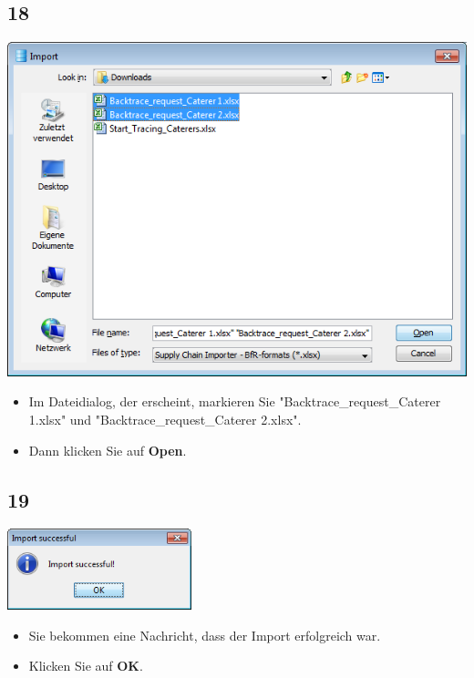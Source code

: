 \documentclass{beamer}
\begin{document}
\subsection{18}
\begin{frame}
	\begin{center}
  		\includegraphics[height=0.5\textheight]{18.png}
	\end{center}
	\begin{itemize}
		\item Im Dateidialog, der erscheint, markieren Sie "Backtrace\_request\_Caterer 1.xlsx" und "Backtrace\_request\_Caterer 2.xlsx".
		\item Dann klicken Sie auf \textbf{Open}.
	\end{itemize}
\end{frame}

\subsection{19}
\begin{frame}
	\begin{center}
  		\includegraphics[width=0.4\textwidth]{19.png}
	\end{center}
	\begin{itemize}
		\item Sie bekommen eine Nachricht, dass der Import erfolgreich war.
		\item Klicken Sie auf \textbf{OK}.
	\end{itemize}
\end{frame}
\end{document}
